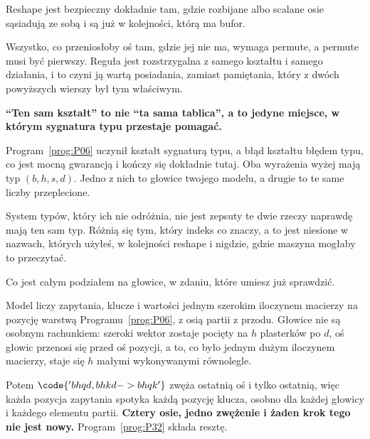 \begin{fr}
\begin{ansblock}
Reshape jest bezpieczny dokładnie tam, gdzie rozbijane albo scalane osie
sąsiadują ze sobą i są już w kolejności, którą ma bufor.
\end{ansblock}

Wszystko, co przeniosłoby oś tam, gdzie jej nie ma, wymaga permute, a permute
musi być pierwszy. Reguła jest rozstrzygalna z samego kształtu i samego
działania, i to czyni ją wartą posiadania, zamiast pamiętania, który z dwóch
powyższych wierszy był tym właściwym.

\begin{trapbox}
\textbf{\enquote{Ten sam kształt} to nie \enquote{ta sama tablica}, a to jedyne
miejsce, w którym sygnatura typu przestaje pomagać.}

Program~\ref{prog:P06} uczynił kształt sygnaturą typu, a błąd kształtu błędem
typu, co jest mocną gwarancją i kończy się dokładnie tutaj. Oba wyrażenia wyżej
mają typ $(b, h, s, d) $. Jedno z nich to głowice twojego modelu, a drugie to
te same liczby przeplecione.

System typów, który ich nie odróżnia, nie jest zepsuty \dash{} te dwie rzeczy
naprawdę mają ten sam typ. Różnią się tym, który indeks co znaczy, a to jest
niesione w nazwach, których użyłeś, w kolejności reshape i nigdzie, gdzie
maszyna mogłaby to przeczytać.
\end{trapbox}

\begin{aibox}
Co jest całym podziałem na głowice, w zdaniu, które umiesz już sprawdzić.

Model liczy zapytania, klucze i wartości jednym szerokim iloczynem macierzy na
pozycję \dash{} warstwą Programu~\ref{prog:P06}, z osią partii z przodu.
Głowice nie są osobnym rachunkiem: szeroki wektor zostaje pocięty na $h$
plasterków po $d$, oś głowic przenosi się przed oś pozycji, a to, co było jednym
dużym iloczynem macierzy, staje się $h$ małymi wykonywanymi równolegle.

Potem $\code{'bhqd,bhkd->bhqk'}$ zwęża ostatnią oś i tylko ostatnią, więc każda
pozycja zapytania spotyka każdą pozycję klucza, osobno dla każdej głowicy i
każdego elementu partii. \textbf{Cztery osie, jedno zwężenie i żaden krok tego
nie jest nowy.} Program~\ref{prog:P32} składa resztę.
\end{aibox}
\end{fr}

